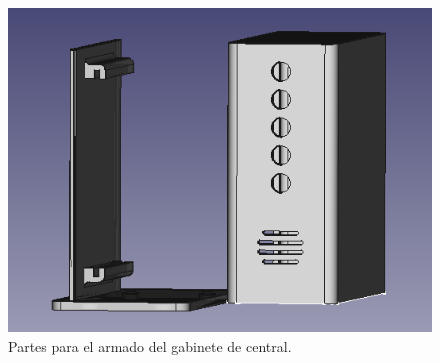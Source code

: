 \begin{figure}[!h]
	\centering
	\includegraphics[scale=.53]{images/central/modelo-3d-central-separado.png}
    \caption{Partes para el armado del gabinete de central.}
	\label{im:impresion-central}
\end{figure}
